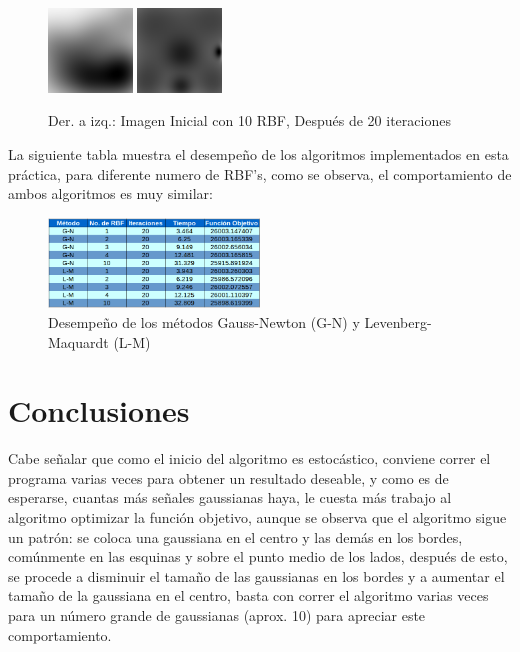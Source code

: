 \documentclass[10pt,journal,compsoc]{styles/IEEEtran}
\begin{document}
\begin{figure}[H]
	\centering
	\includegraphics[width=0.20\textwidth]{GN10_0.png}
	\includegraphics[width=0.20\textwidth]{GN10_20.png}
	\caption{Der. a izq.: Imagen Inicial con 10 RBF, Después de 20 iteraciones}
\end{figure}

La siguiente tabla muestra el desempeño de los algoritmos implementados en esta pr\'actica, para diferente numero de RBF's, como se observa, el comportamiento de ambos algoritmos es muy similar:

\begin{figure}[H]
\centering
\includegraphics[width=0.5\textwidth]{tabla.png}
\caption{Desempeño de los métodos Gauss-Newton (G-N) y Levenberg-Maquardt (L-M)}
\end{figure}

\section{Conclusiones}

Cabe se\~nalar que como el inicio del algoritmo es estocástico, conviene correr el programa varias veces para obtener un resultado deseable, y como es de esperarse, cuantas m\'as señales gaussianas haya, le cuesta m\'as trabajo al algoritmo optimizar la función objetivo, aunque se observa que el algoritmo sigue un patrón: se coloca una gaussiana en el centro y las dem\'as en los bordes, comúnmente en las esquinas y sobre el punto medio de los lados, después de esto, se procede a disminuir el tamaño de las gaussianas en los bordes y a aumentar el tamaño de la gaussiana en el centro, basta con correr el algoritmo varias veces para un n\'umero grande de gaussianas (aprox. 10) para apreciar este comportamiento.\\
\end{document}
